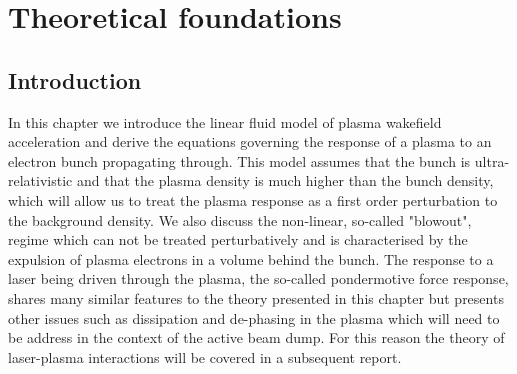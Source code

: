 \chapter{Theoretical foundations}
\section{Introduction}
In this chapter we introduce the linear fluid model of plasma wakefield acceleration and derive the equations governing the response of a plasma to an electron bunch propagating through. This model assumes that the bunch is ultra-relativistic and that the plasma density is much higher than the bunch density, which will allow us to treat the plasma response as a first order perturbation to the background density.  We also discuss the non-linear, so-called "blowout", regime which can not be treated perturbatively and is characterised by the expulsion of plasma electrons in a volume behind the bunch. The response to a laser being driven through the plasma, the so-called pondermotive force response, shares many similar features to the theory presented in this chapter but presents other issues such as dissipation and de-phasing in the plasma which will need to be address in the context of the active beam dump. For this reason the theory of laser-plasma interactions will be covered in a subsequent report. 
